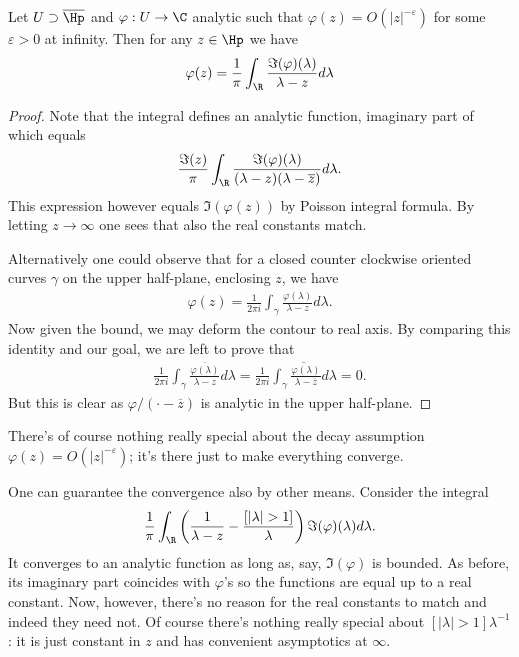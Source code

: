 \begin{lause}
	Let $U \supset \overline{\Hp}$ and $\varphi : U \to \C$ analytic such that $\varphi(z) = O(|z|^{-\varepsilon})$ for some $\varepsilon > 0$ at infinity. Then for any $z \in \Hp$ we have
	\begin{align*}
		\varphi(z) = \frac{1}{\pi}\int_{\R} \frac{\Im(\varphi)(\lambda)}{\lambda - z} d \lambda
	\end{align*}
\end{lause}
\begin{proof}
	Note that the integral defines an analytic function, imaginary part of which equals
	\begin{align*}
		\frac{\Im(z)}{\pi}\int_{\R} \frac{\Im(\varphi)(\lambda)}{(\lambda - z)(\lambda - \overline{z})} d \lambda.
	\end{align*}
	This expression however equals $\Im(\varphi(z))$ by Poisson integral formula. By letting $z \to \infty$ one sees that also the real constants match.

	Alternatively one could observe that for a closed counter clockwise oriented curves $\gamma$ on the upper half-plane, enclosing $z$, we have
	\begin{align*}
		\varphi(z) = \frac{1}{2\pi i}\int_{\gamma} \frac{\varphi(\lambda)}{\lambda - z} d \lambda.
	\end{align*}
	Now given the bound, we may deform the contour to real axis. By comparing this identity and our goal, we are left to prove that
	\begin{align*}
		\frac{1}{2\pi i}\int_{\gamma} \frac{\overline{\varphi(\lambda)}}{\lambda - z} d \lambda = \frac{1}{2\pi i} \overline{\int_{\gamma} \frac{\varphi(\lambda)}{\lambda - \overline{z}} d \lambda} = 0.
	\end{align*}
	But this is clear as $\varphi/(\cdot - \overline{z})$ is analytic in the upper half-plane.
\end{proof}

There's of course nothing really special about the decay assumption $\varphi(z) = O(|z|^{-\varepsilon})$; it's there just to make everything converge.

One can guarantee the convergence also by other means. Consider the integral
\begin{align}\label{easy_pick_repr}
	\frac{1}{\pi}\int_{\R} \left(\frac{1}{\lambda - z} - \frac{[|\lambda| > 1]}{\lambda} \right) \Im(\varphi)(\lambda)d \lambda.
\end{align}
It converges to an analytic function as long as, say, $\Im(\varphi)$ is bounded. As before, its imaginary part coincides with $\varphi$'s so the functions are equal up to a real constant. Now, however, there's no reason for the real constants to match and indeed they need not. Of course there's nothing really special about $[|\lambda| > 1]\lambda^{-1}$: it is just constant in $z$ and has convenient asymptotics at $\infty$.

